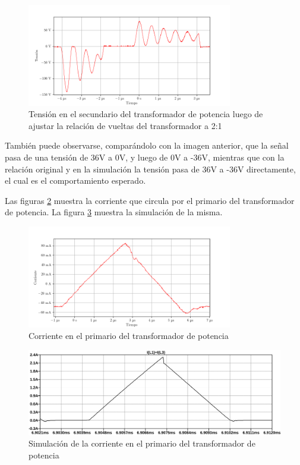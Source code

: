 \begin{figure}[H]
    \centering
    \includegraphics[width=0.8\textwidth]{images/capturas-osciloscopio/17-11-2022/56.png}
    \caption{Tensión en el secundario del transformador de potencia luego de ajustar la relación de vueltas del transformador a 2:1}
    \label{fig:osc:41}
\end{figure}

También puede observarse, comparándolo con la imagen anterior, que la señal pasa de una tensión de 36V a 0V,
y luego de 0V a -36V, mientras que con la relación original y en la simulación la tensión pasa de 36V a -36V directamente,
el cual es el comportamiento esperado.


Las figuras \ref{fig:osc:24} muestra la corriente que circula por el primario del transformador de potencia. La figura \ref{fig:sim:12} muestra la simulación de la misma.

\begin{figure}[H]
    \centering
    \includegraphics[width=0.8\textwidth]{images/capturas-osciloscopio/17-11-2022/24.png}
    \caption{Corriente en el primario del transformador de potencia}
    \label{fig:osc:24}
\end{figure}

\begin{figure}[H]
    \centering
    \includegraphics[width=\textwidth]{images/sim/12.pdf}
    \caption{Simulación de la corriente en el primario del transformador de potencia}
    \label{fig:sim:12}
\end{figure}

